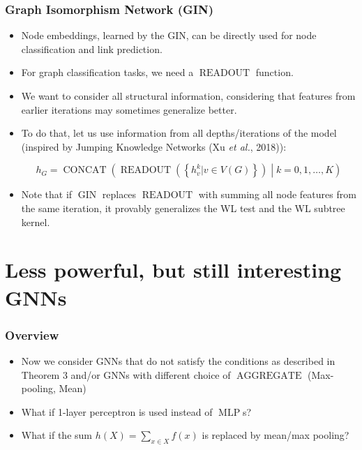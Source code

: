 \documentclass{beamer}
\DeclareMathOperator{\aggregate}{AGGREGATE}
\DeclareMathOperator{\readout}{READOUT}
\DeclareMathOperator{\concat}{CONCAT}
\DeclareMathOperator{\mlp}{MLP}
\DeclareMathOperator{\gin}{GIN}
\begin{document}
\begin{frame}
\frametitle{Graph Isomorphism Network (GIN)}

\begin{itemize}
	\item Node embeddings, learned by the GIN, can be directly used for node classification and link prediction. \pause
	
	\item For graph classification tasks, we need a $\readout$ function. \pause
	
	\item We want to consider all structural information, considering that features from earlier iterations may sometimes generalize better. \pause
	
	\item To do that, let us use information from all depths/iterations of the model (inspired by Jumping Knowledge Networks (Xu {\it et al.}, 2018)):
	
	$$h_G = \concat \left( \readout \left( \left\{ h_v^{k} | v \in V(G) \right\} \right) \middle| k = 0, 1, \dots, K \right)$$ \pause
	
	\item Note that if $\gin$ replaces $\readout$ with summing all node features from the same iteration, it provably generalizes the WL test and the WL subtree kernel.
\end{itemize}

\end{frame}


\section{Less powerful, but still interesting GNNs}

\begin{frame}
\frametitle{Overview}

\begin{itemize}
	\item Now we consider GNNs that do not satisfy the conditions as described in Theorem 3 and/or GNNs with different choice of $\aggregate$ (Max-pooling, Mean) \pause
	
	\item What if 1-layer perceptron is used instead of $\mlp$s? \pause
	
	\item What if the sum $h(X) = \sum_{x \in X} f(x)$ is replaced by mean/max pooling?
	
\end{itemize}
\end{frame}
\end{document}
